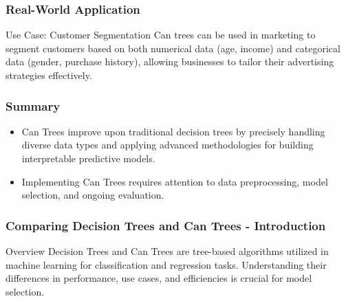 \documentclass[aspectratio=169]{beamer}
\begin{document}
\begin{frame}
    \frametitle{Real-World Application}
    \begin{block}{Use Case: Customer Segmentation}
        Can trees can be used in marketing to segment customers based on both numerical data (age, income) and categorical data (gender, purchase history), allowing businesses to tailor their advertising strategies effectively.
    \end{block}
\end{frame}

\begin{frame}
    \frametitle{Summary}
    \begin{itemize}
        \item Can Trees improve upon traditional decision trees by precisely handling diverse data types and applying advanced methodologies for building interpretable predictive models.
        \item Implementing Can Trees requires attention to data preprocessing, model selection, and ongoing evaluation.
    \end{itemize}
\end{frame}

\begin{frame}[fragile]
    \frametitle{Comparing Decision Trees and Can Trees - Introduction}
    \begin{block}{Overview}
        Decision Trees and Can Trees are tree-based algorithms utilized in machine learning for classification and regression tasks. 
        Understanding their differences in performance, use cases, and efficiencies is crucial for model selection.
    \end{block}
\end{frame}
\end{document}

